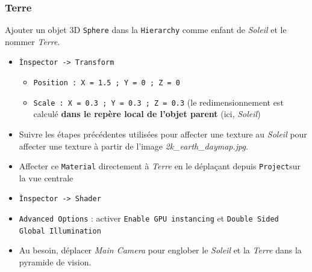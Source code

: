 \documentclass[a4paper,10pt]{article}
\newenvironment{solution}%
{\begin{tcolorbox}[breakable,colback=red!5!white,colframe=red!75!black,title=Solution]}%
{\end{tcolorbox}}
\begin{document}
\ifversionenseignant
\begin{solution}
\subsubsection{Terre}
Ajouter un objet 3D \texttt{Sphere} dans la \texttt{Hierarchy} comme enfant de \textit{Soleil} et le nommer \textit{Terre}.
\begin{itemize}
	\item \texttt{Ìnspector -> Transform}
	\begin{itemize}
		\item \texttt{Position : X = 1.5 ; Y = 0 ; Z = 0} 
		\item \texttt{Scale : X = 0.3 ; Y = 0.3 ; Z = 0.3} (le redimensionnement est calculé \textbf{dans le repère local de l'objet parent} (ici, \textit{Soleil})		
	\end{itemize}
\item Suivre les étapes précédentes utilisées pour affecter une texture au \textit{Soleil} pour affecter une texture à partir de l'image \textit{2k\_earth\_daymap.jpg}.
\item Affecter ce \texttt{Material} directement à \textit{Terre} en le déplaçant depuis \texttt{Project}sur la vue centrale
\item \texttt{Ìnspector -> Shader}
\item \texttt{Advanced Options} : activer \texttt{Enable GPU instancing} et \texttt{Double Sided Global Illumination}
\item Au besoin, déplacer \textit{Main Camera} pour englober le \textit{Soleil} et la \textit{Terre} dans la pyramide de vision.
\end{itemize}


\end{solution}
\end{document}
